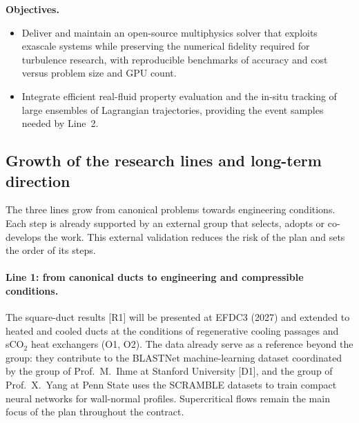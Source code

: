 \documentclass[11pt]{article}
\begin{document}
\textbf{Objectives.}
\begin{itemize}
  \item[\textbf{O5.}] Deliver and maintain an open-source multiphysics solver that
  exploits exascale systems while preserving the numerical fidelity required for turbulence
  research, with reproducible benchmarks of accuracy and cost versus problem size and GPU
  count.
  \item[\textbf{O6.}] Integrate efficient real-fluid property evaluation and the in-situ
  tracking of large ensembles of Lagrangian trajectories, providing the event samples
  needed by Line~2.
\end{itemize}

\subsection{Growth of the research lines and long-term direction}\label{sec:growth}
The three lines grow from canonical problems towards engineering conditions. Each step is
already supported by an external group that selects, adopts or co-develops the work. This
external validation reduces the risk of the plan and sets the order of its steps.

\paragraph{Line 1: from canonical ducts to engineering and compressible conditions.} The
square-duct results [R1] will be presented at EFDC3 (2027) and extended to heated and cooled
ducts at the conditions of regenerative cooling passages and sCO$_2$ heat exchangers (O1,
O2). The data already serve as a reference beyond the group: they contribute to the BLASTNet
machine-learning dataset coordinated by the group of Prof.\ M.\ Ihme at Stanford University
[D1], and the group of Prof.\ X.\ Yang at Penn State uses the SCRAMBLE datasets to train
compact neural networks for wall-normal profiles. Supercritical flows remain the main focus
of the plan throughout the contract.
\end{document}
